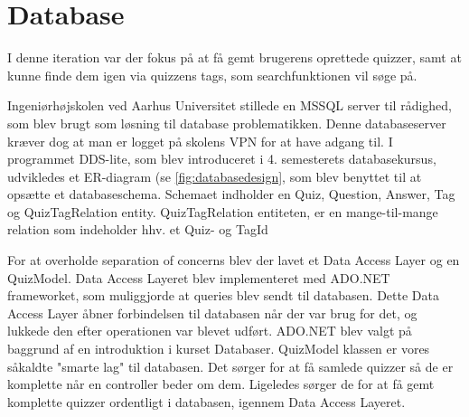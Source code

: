 \section{Database}
I denne iteration var der fokus på at få gemt brugerens oprettede quizzer, samt at kunne finde dem igen via quizzens tags, som searchfunktionen vil søge på.

Ingeniørhøjskolen ved Aarhus Universitet stillede en MSSQL server til rådighed, som blev brugt som løsning til database problematikken. Denne databaseserver kræver dog at man er logget på skolens VPN for at have adgang til. I programmet DDS-lite, som blev introduceret i 4. semesterets databasekursus, udvikledes et ER-diagram (se \ref{fig:databasedesign}, som blev benyttet til at opsætte et databaseschema. Schemaet indholder en Quiz, Question, Answer, Tag og QuizTagRelation entity. QuizTagRelation entiteten, er en mange-til-mange relation som indeholder hhv. et Quiz- og TagId


For at overholde separation of concerns blev der lavet et Data Access Layer og en QuizModel. Data Access Layeret blev implementeret med ADO.NET frameworket, som muliggjorde at queries blev sendt til databasen. Dette Data Access Layer åbner forbindelsen til databasen når der var brug for det, og lukkede den efter operationen var blevet udført. ADO.NET blev valgt på baggrund af en introduktion i kurset Databaser. QuizModel klassen er vores såkaldte "smarte lag" til databasen. Det sørger for at få samlede quizzer så de er komplette når en controller beder om dem. Ligeledes sørger de for at få gemt komplette quizzer ordentligt i databasen, igennem Data Access Layeret.



